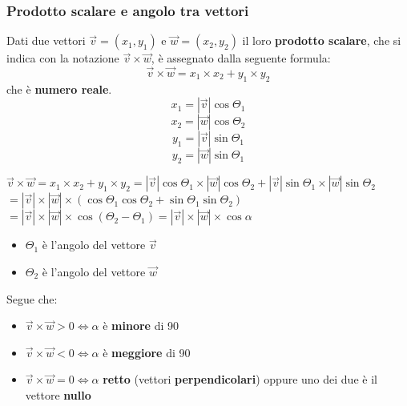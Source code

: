 \documentclass{article}
\begin{document}
\subsubsection{Prodotto scalare e angolo tra vettori}

Dati due vettori $\overrightarrow{v}=(x_1, y_1)$ e $\overrightarrow{w}=(x_2,y_2)$ il loro \textbf{prodotto scalare}, che si indica con la notazione $\overrightarrow{v}\times\overrightarrow{w}$, è assegnato dalla seguente formula:
\begin{equation*}
  \overrightarrow{v}\times\overrightarrow{w}= x_1 \times x_2 + y_1 \times y_2 
\end{equation*} che è \textbf{numero reale}.
\begin{equation*}
  x_1=|\overrightarrow{v}|\cos\Theta_1
\end{equation*}
\begin{equation*}
  x_2=|\overrightarrow{w}|\cos\Theta_2
\end{equation*}
\begin{equation*}
  y_1=|\overrightarrow{v}|\sin\Theta_1
\end{equation*}
\begin{equation*}
  y_2=|\overrightarrow{w}|\sin\Theta_1
\end{equation*}

$\overrightarrow{v}\times\overrightarrow{w}= x_1 \times x_2 + y_1 \times y_2 = |\overrightarrow{v}|\cos\Theta_1 \times |\overrightarrow{w}|\cos\Theta_2+|\overrightarrow{v}|\sin\Theta_1 \times |\overrightarrow{w}|\sin\Theta_2$\\
$=|\overrightarrow{v}|\times|\overrightarrow{w}|\times(\cos\Theta_1\cos\Theta_2+\sin\Theta_1\sin\Theta_2)$\\
$=|\overrightarrow{v}|\times|\overrightarrow{w}|\times\cos(\Theta_2-\Theta_1) = |\overrightarrow{v}|\times|\overrightarrow{w}| \times\cos\alpha$\\
\begin{itemize}
  \item $\Theta_1$ è l'angolo del vettore $\overrightarrow{v}$
  \item $\Theta_2$ è l'angolo del vettore $\overrightarrow{w}$
\end{itemize}
Segue che:
\begin{itemize}
  \item $\overrightarrow{v}\times\overrightarrow{w}> 0\iff \alpha$ è \textbf{minore} di 90
  \item $\overrightarrow{v}\times\overrightarrow{w}< 0\iff \alpha$ è \textbf{meggiore} di 90
  \item $\overrightarrow{v}\times\overrightarrow{w}= 0\iff \alpha$ \textbf{retto} (vettori \textbf{perpendicolari}) oppure uno dei due è il vettore \textbf{nullo}
\end{itemize}
 
\end{document}
